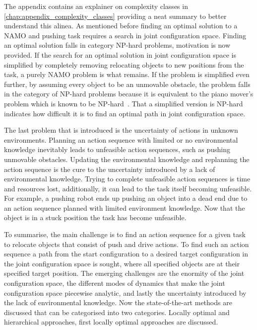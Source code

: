 The appendix contains an explainer on complexity classes in \cref{chap:appendix_complexity_classes} providing a neat summary to better understand this alinea. As mentioned before finding an optimal solution to a \ac{NAMO} and pushing task requires a search in joint configuration space. Finding an optimal solution falls in category \ac{NP-hard} problems, motivation is now provided. If the search for an optimal solution in joint configuration space is simplified by completely removing relocating objects to new positions from the task, a purely \ac{NAMO} problem is what remains. If the problem is simplified even further, by assuming every object to be an unmovable obstacle, the problem falls in the category of \ac{NP-hard} problems because it is equivalent to the piano mover's problem which is known to be \ac{NP-hard}~\cite{reif_motion_1985}. That a simplified version is \ac{NP-hard} indicates how difficult it is to find an optimal path in joint configuration space.\bs

The last problem that is introduced is the uncertainty of actions in unknown environments. Planning an action sequence with limited or no environmental knowledge inevitably leads to unfeasible action sequences, such as pushing unmovable obstacles. Updating the environmental knowledge and replanning the action sequence is the cure to the uncertainty introduced by a lack of environmental knowledge. Trying to complete unfeasible action sequences is time and resources lost, additionally, it can lead to the task itself becoming unfeasible. For example, a pushing robot ends up pushing an object into a dead end due to an action sequence planned with limited environment knowledge. Now that the object is in a stuck position the task has become unfeasible.\bs

To summarise, the main challenge is to find an action sequence for a given task to relocate objects that consist of push and drive actions. To find such an action sequence a path from the start configuration to a desired target configuration in the joint configuration space is sought, where all specified objects are at their specified target position. The emerging challenges are the enormity of the joint configuration space, the different modes of dynamics that make the joint configuration space piecewise analytic, and lastly the uncertainty introduced by the lack of environmental knowledge. Now the state-of-the-art methods are discussed that can be categorised into two categories. Locally optimal and hierarchical approaches, first locally optimal approaches are discussed.\bs

